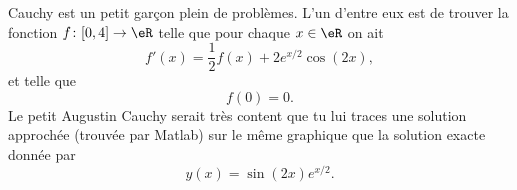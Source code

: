 \begin{exercice}\label{exotestMAT1151-G320001}

	Cauchy est un petit garçon plein de problèmes. L'un d'entre eux est de trouver la fonction $f\colon \mathopen[ 0 , 4 \mathclose]\to \eR$ telle que pour chaque $x\in\eR$ on ait
	\begin{equation}
		f'(x)=\frac{ 1 }{2}f(x)+2 e^{x/2}\cos(2x),
	\end{equation}
	et telle que
	\begin{equation}
		f(0)=0.
	\end{equation}
	Le petit Augustin Cauchy serait très content que tu lui traces une solution approchée (trouvée par Matlab) sur le même graphique que la solution exacte donnée par
	\begin{equation}
		y(x)=\sin(2x) e^{x/2}.
	\end{equation}

\end{exercice}
